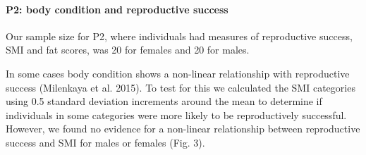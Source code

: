 \documentclass[
]{article}
\begin{document}
\hypertarget{p2-body-condition-and-reproductive-success}{%
\paragraph{P2: body condition and reproductive
success}\label{p2-body-condition-and-reproductive-success}}

Our sample size for P2, where individuals had measures of reproductive
success, SMI and fat scores, was 20 for females and 20 for males.

In some cases body condition shows a non-linear relationship with
reproductive success (Milenkaya et al. 2015). To test for this we
calculated the SMI categories using 0.5 standard deviation increments
around the mean to determine if individuals in some categories were more
likely to be reproductively successful. However, we found no evidence
for a non-linear relationship between reproductive success and SMI for
males or females (Fig. 3).
\end{document}
